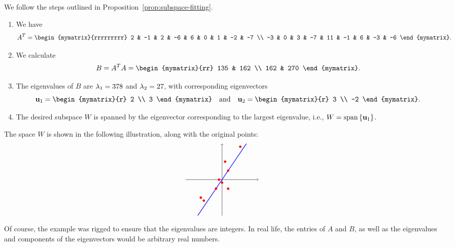 \begin{solution}
  We follow the steps outlined in Proposition~\ref{prop:subspace-fitting}.
  \begin{enumerate}
  \item We have
    \begin{equation*}
      A^T = \begin{mymatrix}{rrrrrrrrr}
        2 & -1 & 2 & -6 & 6 & 0 & 1 & -2 & -7 \\
        -3 & 0 & 3 & -7 & 11 & -1 & 6 & -3 & -6
      \end{mymatrix}.
    \end{equation*}
  \item We calculate
    \begin{equation*}
      B = A^TA = \begin{mymatrix}{rr}
        135 & 162 \\
        162 & 270
      \end{mymatrix}.
    \end{equation*}
  \item The eigenvalues of $B$ are $\lambda_1 = 378$ and
    $\lambda_2 = 27$, with corresponding eigenvectors
    \begin{equation*}
      \vect{u}_1 = \begin{mymatrix}{r} 2 \\ 3 \end{mymatrix}
      \quad\mbox{and}\quad
      \vect{u}_2 = \begin{mymatrix}{r} 3 \\ -2 \end{mymatrix}.
    \end{equation*}
  \item The desired subspace $W$ is spanned by the eigenvector
    corresponding to the largest eigenvalue, i.e.,
    $W=\sspan\set{\vect{u}_1}$.
  \end{enumerate}
  The space $W$ is shown in the following illustration, along with the
  original points:
  \begin{equation*}
    \begin{tikzpicture}[scale=0.15]
      \draw[thin,->] (-12,0) -- (12,0);
      \draw[thin,->] (0,-12) -- (0,12);
      \draw[thick,blue] (-8,-12) -- (8,12);
      \fill[color=red] (2,-3) circle (0.4);
      \fill[color=red] (-1, 0) circle (0.4);
      \fill[color=red] (2, 3) circle (0.4);
      \fill[color=red] (-6, -7) circle (0.4);
      \fill[color=red] (6, 11) circle (0.4);
      \fill[color=red] (0, -1) circle (0.4);
      \fill[color=red] (1, 6) circle (0.4);
      \fill[color=red] (-2, -3) circle (0.4);
      \fill[color=red] (-7, -6) circle (0.4);
    \end{tikzpicture}
  \end{equation*}
  Of course, the example was rigged to ensure that the eigenvalues
  are integers. In real life, the entries of $A$ and $B$, as well as
  the eigenvalues and components of the eigenvectors would be
  arbitrary real numbers.
\end{solution}

